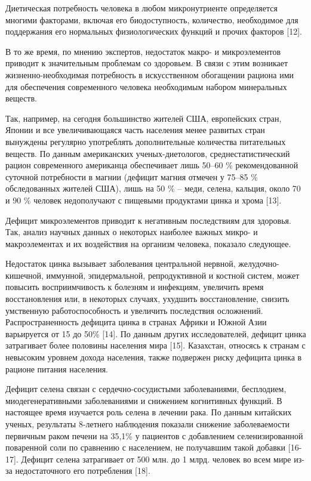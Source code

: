 Диетическая потребность человека в любом микронутриенте определяется
многими факторами, включая его биодоступность, количество, необходимое
для поддержания его нормальных физиологических функций и прочих факторов
{[}12{]}.

В то же время, по мнению экспертов, недостаток макро- и микроэлементов
приводит к значительным проблемам со здоровьем. В связи с этим возникает
жизненно-необходимая потребность в искусственном обогащении рациона ими
для обеспечения современного человека необходимым набором минеральных
веществ.

Так, например, на сегодня большинство жителей США, европейских стран,
Японии и все увеличивающаяся часть населения менее развитых стран
вынуждены регулярно употреблять дополнительные количества питательных
веществ. По данным американских ученых-диетологов, среднестатистический
рацион современного американца обеспечивает лишь 50--60 \%
рекомендованной суточной потребности в магнии (дефицит магния отмечен у
75--85 \% обследованных жителей США), лишь на 50 \% -- меди, селена,
кальция, около 70 и 90 \% человек недополучают с пищевыми продуктами
цинка и хрома {[}13{]}.

Дефицит микроэлементов приводит к негативным последствиям для здоровья.
Так, анализ научных данных о некоторых наиболее важных микро- и
макроэлементах и их воздействия на организм человека, показало
следующее.

Недостаток цинка вызывает заболевания центральной нервной,
желудочно-кишечной, иммунной, эпидермальной, репродуктивной и костной
систем, может повысить восприимчивость к болезням и инфекциям, увеличить
время восстановления или, в некоторых случаях, ухудшить восстановление,
снизить умственную работоспособность и увеличить последствия осложнений.
Распространенность дефицита цинка в странах Африки и Южной Азии
варьируется от 15 до 50\% {[}14{]}. По данным других исследователей,
дефицит цинка затрагивает более половины населения мира {[}15{]}.
Казахстан, относясь к странам с невысоким уровнем дохода населения,
также подвержен риску дефицита цинка в рационе питания населения.

Дефицит селена связан с сердечно-сосудистыми заболеваниями, бесплодием,
миодегенеративными заболеваниями и снижением когнитивных функций. В
настоящее время изучается роль селена в лечении рака. По данным
китайских ученых, результаты 8-летнего наблюдения показали снижение
заболеваемости первичным раком печени на 35,1\% у пациентов с
добавлением селенизированной поваренной соли по сравнению с населением,
не получавшим такой добавки {[}16-17{]}. Дефицит селена затрагивает от
500 млн. до 1 млрд. человек во всем мире из-за недостаточного его
потребления {[}18{]}.

